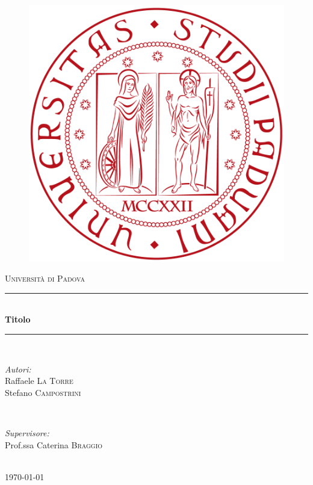 \documentclass{article}
\begin{document}
\begin{titlepage}
\newcommand{\HRule}{\rule{\linewidth}{0.5mm}}
\center


\begin{figure}
\center
\includegraphics[scale=0.1]{logo}
\end{figure}


\textsc{\LARGE Università di Padova}\\[1.5cm]
\HRule \\[0.4cm]
{ \huge \bfseries Titolo}\\[0.4cm]
\HRule \\[1.5cm]

\begin{minipage}{0.4\textwidth}
\begin{flushleft} \large
\emph{Autori:}\\
Raffaele \textsc{La Torre} \\
Stefano \textsc{Campostrini}
\end{flushleft}
\end{minipage}
~
\begin{minipage}{0.4\textwidth}
\begin{flushright} \large
\emph{Supervisore:} \\
Prof.ssa Caterina \textsc{Braggio}
\end{flushright}
\end{minipage}\\[4cm]

{\large \today}\\[3cm]

\vfill
\end{titlepage}
\end{document}
